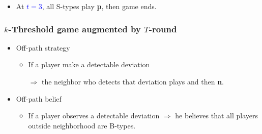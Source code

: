 \documentclass[9pt]{beamer}
\begin{document}
\begin{frame}
\begin{itemize}
\begin{itemize}
\pause
\item At \textcolor{blue}{$t=3$}, all S-types play \textbf{p}, then game ends.

\end{itemize}

\end{itemize}



\end{frame}


\begin{frame}
  \frametitle{$k$-Threshold game augmented by $T$-round }


\begin{itemize}

\item Off-path strategy
\begin{itemize}
\item If a player make a detectable deviation 

$\Rightarrow$ the neighbor who detects that deviation plays  and then \textbf{n}.
\end{itemize}
\item Off-path belief
\begin{itemize}
\item If a player observes a detectable deviation $\Rightarrow$ he believes that all players outside neighborhood are B-types. 
\end{itemize}
\end{itemize}



\end{frame}
\end{document}
